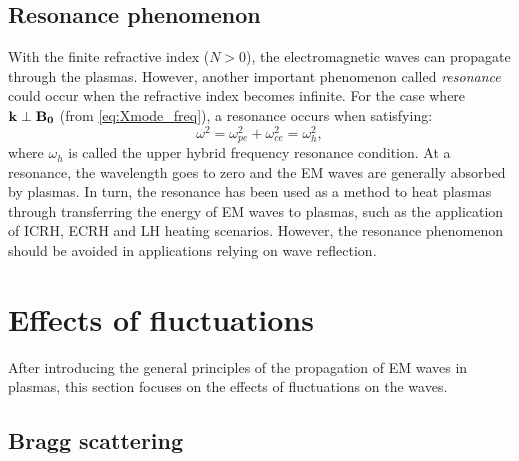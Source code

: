 \subsection{Resonance phenomenon}


With the finite refractive index ($N > 0$), the electromagnetic waves can propagate through the plasmas. However, another important phenomenon called \emph{resonance} could occur when the refractive index becomes infinite. For the case where $\boldsymbol{\mathrm{k}} \perp \boldsymbol{\mathrm{B_0}}$ (from \eqref{eq:Xmode_freq}), a resonance occurs when satisfying:
\begin{equation}\label{eq:upper_hybrid_freq}
  \omega^2 = \omega_{pe}^2 + \omega_{ce}^2 = \omega_h^2,
\end{equation}
\noindent where $\omega_h$ is called the upper hybrid frequency resonance condition. At a resonance, the wavelength goes to zero and the EM waves are generally absorbed by plasmas. In turn, the resonance has been used as a method to heat plasmas through transferring the energy of EM waves to plasmas, such as the application of ICRH, ECRH and LH heating scenarios. However, the resonance phenomenon should be avoided in applications relying on wave reflection.


\section{Effects of fluctuations} \label{sec:effects_of_fluctuations}

After introducing the general principles of the propagation of EM waves in plasmas, this section focuses on the effects of fluctuations on the waves.

\subsection{Bragg scattering}


